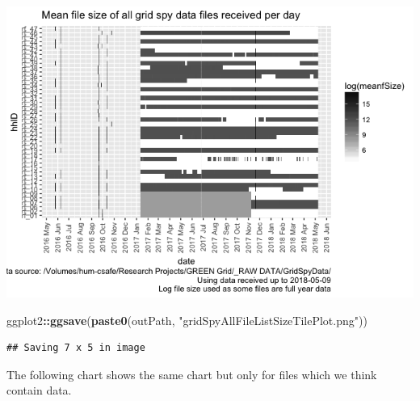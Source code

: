 \documentclass[]{article}
\newenvironment{Shaded}{\begin{snugshade}}{\end{snugshade}}
\newcommand{\KeywordTok}[1]{\textcolor[rgb]{0.13,0.29,0.53}{\textbf{#1}}}
\newcommand{\StringTok}[1]{\textcolor[rgb]{0.31,0.60,0.02}{#1}}
\newcommand{\OperatorTok}[1]{\textcolor[rgb]{0.81,0.36,0.00}{\textbf{#1}}}
\newcommand{\NormalTok}[1]{#1}
\begin{document}
\includegraphics{processNZGGElecCons1minData_files/figure-html/allFileSizesPlot-1.png}

\begin{Shaded}
\begin{Highlighting}[]
\NormalTok{ggplot2}\OperatorTok{::}\KeywordTok{ggsave}\NormalTok{(}\KeywordTok{paste0}\NormalTok{(outPath, }\StringTok{"gridSpyAllFileListSizeTilePlot.png"}\NormalTok{))}
\end{Highlighting}
\end{Shaded}

\begin{verbatim}
## Saving 7 x 5 in image
\end{verbatim}

The following chart shows the same chart but only for files which we
think contain data.
\end{document}
